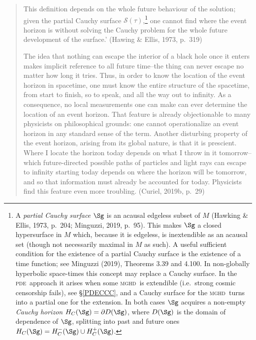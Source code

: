 \documentclass[11pt,a4paper]{article}
\newcommand{\mghd}{\textsc{mghd}}
\newcommand{\pde}{\textsc{pde}}
\newcommand{\p}{\partial}
\begin{document}
 \begin{quote}
\begin{small}
This definition depends on the whole future behaviour of the solution; given the partial Cauchy surface $\mathcal{S}(\tau)$,\footnote{A \emph{partial Cauchy surface} $\Sg$ is an acausal edgeless subset of $M$ (Hawking \& Ellis, 1973, p.\ 204; Minguzzi, 2019, p.\ 95). This makes $\Sg$ a closed hypersurface in $M$ which, 
because it is edgeless, is inextendible as an acausal set (though not necessarily maximal in $M$ as such). A useful sufficient condition for the existence of a partial Cauchy surface is the existence of a time function; see Minguzzi (2019), Theorems 3.39 and 4.100.  In non-globally hyperbolic space-times this concept may  replace a Cauchy surface. In the \pde\ approach it arises when some \mghd\ is extendible (i.e.\ strong cosmic censorship fails), see \S\ref{PDECCC}, and a Cauchy surface 
for the \mghd\ turns into a partial one for the extension. 
In both cases $\Sg$ acquires a non-empty \emph{Cauchy horizon} $H_C(\Sg)=\p D(\Sg)$, where $D(\Sg)$ is the domain of dependence of $\Sg$, splitting into past and future ones $H_C(\Sg)=H_C^-(\Sg)\cup H_C^+(\Sg)$. 
 }
  one cannot find where the event horizon is without solving the Cauchy problem for the whole future development of the surface.' (Hawing \& Ellis, 1973, p.\ 319)

The idea that nothing can escape the interior of a black hole once it enters makes implicit reference to all future time--the thing can never escape no matter how long it tries. Thus, in order to know the location of the event horizon in spacetime, one must know the entire structure of the spacetime, from start to finish, so to speak, and all the way out to infinity. As a consequence, no local measurements one can make can ever determine the location of an event horizon. That feature is already objectionable to many physicists on philosophical grounds: one cannot operationalize an event horizon in any standard sense of the term. Another disturbing property of the event horizon, arising from its global nature, is that it is prescient. Where I locate the horizon today depends on what I throw in it tomorrow--which future-directed possible paths of particles and light rays can escape to infinity starting today depends on where the horizon will be tomorrow, and so that information must already be accounted for today. Physicists find this feature even more troubling. (Curiel, 2019b, p.\ 29)
\end{small}
\end{quote}
\end{document}
